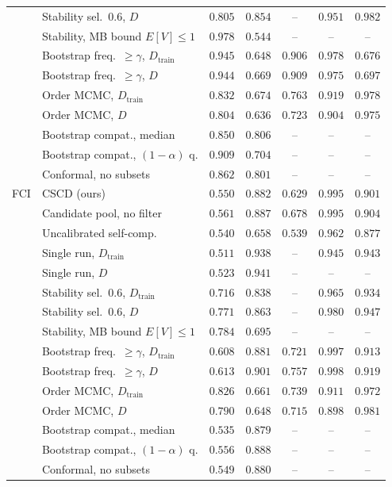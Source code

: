 \begin{tabular}{llccccc}
 & Stability sel.\ 0.6, $D$ & $0.805$ & $0.854$ & -- & $0.951$ & $0.982$ \\
 & Stability, MB bound $E[V]\le1$ & $0.978$ & $0.544$ & -- & -- & -- \\
 & Bootstrap freq.\ $\ge\gamma$, $D_{\mathrm{train}}$ & $0.945$ & $0.648$ & $0.906$ & $0.978$ & $0.676$ \\
 & Bootstrap freq.\ $\ge\gamma$, $D$ & $0.944$ & $0.669$ & $0.909$ & $0.975$ & $0.697$ \\
 & Order MCMC, $D_{\mathrm{train}}$ & $0.832$ & $0.674$ & $0.763$ & $0.919$ & $0.978$ \\
 & Order MCMC, $D$ & $0.804$ & $0.636$ & $0.723$ & $0.904$ & $0.975$ \\
 & Bootstrap compat., median & $0.850$ & $0.806$ & -- & -- & -- \\
 & Bootstrap compat., $(1-\alpha)$ q. & $0.909$ & $0.704$ & -- & -- & -- \\
 & Conformal, no subsets & $0.862$ & $0.801$ & -- & -- & -- \\
\addlinespace
FCI & CSCD (ours) & $0.550$ & $0.882$ & $0.629$ & $0.995$ & $0.901$ \\
 & Candidate pool, no filter & $0.561$ & $0.887$ & $0.678$ & $0.995$ & $0.904$ \\
 & Uncalibrated self-comp. & $0.540$ & $0.658$ & $0.539$ & $0.962$ & $0.877$ \\
 & Single run, $D_{\mathrm{train}}$ & $0.511$ & $0.938$ & -- & $0.945$ & $0.943$ \\
 & Single run, $D$ & $0.523$ & $0.941$ & -- & -- & -- \\
 & Stability sel.\ 0.6, $D_{\mathrm{train}}$ & $0.716$ & $0.838$ & -- & $0.965$ & $0.934$ \\
 & Stability sel.\ 0.6, $D$ & $0.771$ & $0.863$ & -- & $0.980$ & $0.947$ \\
 & Stability, MB bound $E[V]\le1$ & $0.784$ & $0.695$ & -- & -- & -- \\
 & Bootstrap freq.\ $\ge\gamma$, $D_{\mathrm{train}}$ & $0.608$ & $0.881$ & $0.721$ & $0.997$ & $0.913$ \\
 & Bootstrap freq.\ $\ge\gamma$, $D$ & $0.613$ & $0.901$ & $0.757$ & $0.998$ & $0.919$ \\
 & Order MCMC, $D_{\mathrm{train}}$ & $0.826$ & $0.661$ & $0.739$ & $0.911$ & $0.972$ \\
 & Order MCMC, $D$ & $0.790$ & $0.648$ & $0.715$ & $0.898$ & $0.981$ \\
 & Bootstrap compat., median & $0.535$ & $0.879$ & -- & -- & -- \\
 & Bootstrap compat., $(1-\alpha)$ q. & $0.556$ & $0.888$ & -- & -- & -- \\
 & Conformal, no subsets & $0.549$ & $0.880$ & -- & -- & -- \\
\bottomrule
\end{tabular}
